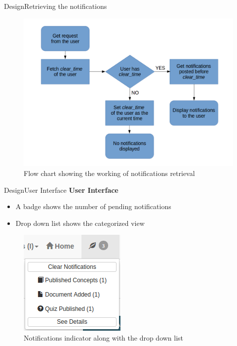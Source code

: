 \documentclass[xcolor=table]{beamer}
\begin{document}
\begin{frame}{Design}{Retrieving the notifications}
	
\begin{figure}
\centering
\includegraphics[width=0.7\linewidth]{./media/notif_flow}
\caption{Flow chart showing the working of notifications retrieval}
\label{fig:notif_flow}
\end{figure}
\end{frame}

\begin{frame}{Design}{User Interface}
\textbf{User Interface}
\begin{itemize}
	\item A badge shows the number of pending notifications
	\item Drop down list shows the categorized view
\end{itemize}
\begin{figure}
\centering
\includegraphics[width=0.3\linewidth]{./media/notif_ui}
\caption{Notifications indicator along with the drop down list}
\label{fig:notif_ui}
\end{figure}
\end{frame}
\end{document}
